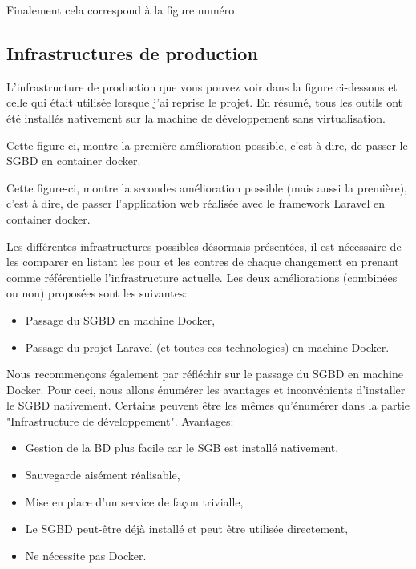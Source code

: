 \documentclass[
    iai, %
    il, %
]{heig-tb}
\begin{document}
Finalement cela correspond à la figure numéro %

\clearpage
\subsection{Infrastructures de production}

L'infrastructure de production que vous pouvez voir dans la figure ci-dessous et celle qui était utilisée lorsque j'ai reprise le projet.
En résumé, tous les outils ont été installés nativement sur la machine de développement sans virtualisation.

Cette figure-ci, montre la première amélioration possible, c'est à dire, de passer le SGBD en container docker.

Cette figure-ci, montre la secondes amélioration possible (mais aussi la première), c'est à dire, de passer l'application web réalisée avec le framework Laravel en container docker.

Les différentes infrastructures possibles désormais présentées, il est nécessaire de les comparer en listant les pour et les contres de chaque changement en prenant comme référentielle l'infrastructure actuelle.
Les deux améliorations (combinées ou non) proposées sont les suivantes:
\begin{itemize}
    \item Passage du SGBD en machine Docker,
    \item Passage du projet Laravel (et toutes ces technologies) en machine Docker.
\end{itemize}


Nous recommençons également par réfléchir sur le passage du SGBD en machine Docker.
Pour ceci, nous allons énumérer les avantages et inconvénients d'installer le SGBD nativement.
Certains peuvent être les mêmes qu'énumérer dans la partie "Infrastructure de développement". %
Avantages:
\begin{itemize}
    \item Gestion de la BD plus facile car le SGB est installé nativement,
    \item Sauvegarde aisément réalisable,
    \item Mise en place d'un service de façon trivialle,
    \item Le SGBD peut-être déjà installé et peut être utilisée directement,
    \item Ne nécessite pas Docker.
\end{itemize}
\end{document}
